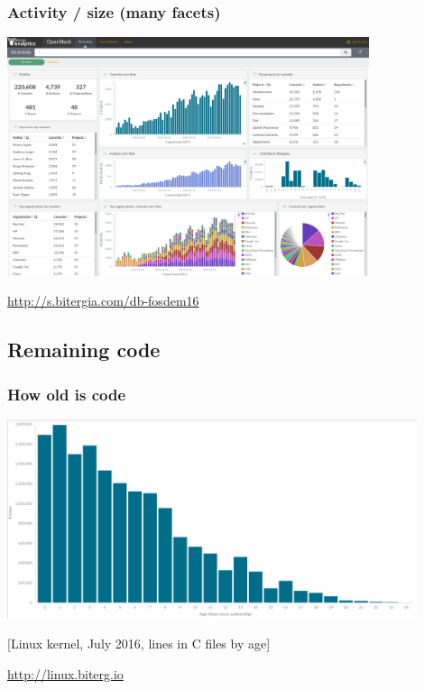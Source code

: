 \documentclass[17pt,aspectratio=169,hyperref=pdfusetitle]{beamer}
\begin{document}
\begin{frame}
\frametitle{Activity / size (many facets)}

\begin{center}
  \includegraphics[height=7cm]{figs/bitergia-analytics-fosdem16}
\end{center}

\begin{flushright}
  \url{http://s.bitergia.com/db-fosdem16}
\end{flushright}
\end{frame}

\subsection{Remaining code}

\begin{frame}
\frametitle{How old is code}

\begin{center}
  \includegraphics[width=12cm]{figs/linux-age-c}
\end{center}

{\Large
[Linux kernel, July 2016, lines in C files by age]
}

\begin{flushright}
  \url{http://linux.biterg.io}
\end{flushright}
\end{frame}
\end{document}
